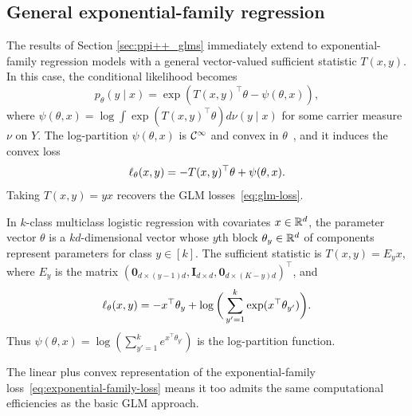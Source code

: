 \subsection{General exponential-family regression}
\label{sec:general-expfam}

The results of Section \ref{sec:ppi++_glms} immediately extend to
exponential-family regression models with a general vector-valued sufficient
statistic $T(x,y)$.  In this case, the conditional likelihood becomes
\begin{equation*}
  p_{\theta}(y \mid x) = \exp\left( T(x,y)^\top \theta - \psi(\theta, x) \right),
\end{equation*}
where $\psi(\theta,x) = \log \int \exp(T(x,y)^\top \theta) d\nu(y \mid x)$
for some carrier measure $\nu$ on $Y$.
The log-partition $\psi(\theta, x)$ is $\mathcal{C}^\infty$
and convex in $\theta$~\cite{Brown86}, and it 
induces the convex loss
\begin{equation}
  \label{eq:exponential-family-loss}
  \ell_\theta(x,y) = -T(x,y)^\top \theta + \psi(\theta,x).
\end{equation}
Taking $T(x,y)=y x$ recovers the GLM losses~\eqref{eq:glm-loss}.

\begin{example}
  In $k$-class multiclass logistic regression with covariates $x \in \mathbb{R}^d$,
  the parameter vector $\theta$ is a $kd$-dimensional vector whose $y$th
  block $\theta_y \in \mathbb{R}^d$ of components represent parameters for class $y
  \in [k]$. The sufficient statistic is $T(x,y) = E_y x$, where $E_y$ is the
  matrix $(\mathbf{0}_{d\times (y-1)d}, \mathbf{I}_{d \times d},
  \mathbf{0}_{d\times (K-y)d})^\top$, and
  \begin{equation*}
    \ell_\theta(x, y)
    = -x^\top \theta_y + \log\bigg(\sum_{y' = 1}^k \exp(x^\top \theta_{y'})\bigg).
  \end{equation*}
  Thus $\psi(\theta, x) = \log(\sum_{y' = 1}^k e^{x^\top \theta_{y'}})$ is the
  log-partition function.
\end{example}


The linear plus convex representation of the exponential-family
loss~\eqref{eq:exponential-family-loss} means
it too admits the same computational efficiencies
as the basic GLM approach.

